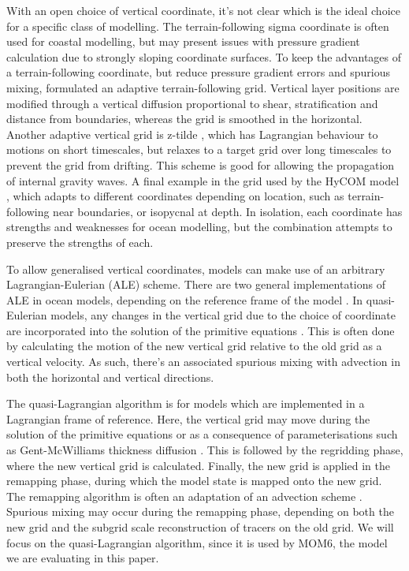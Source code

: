 With an open choice of vertical coordinate, it's not clear which is the ideal choice for a specific class of modelling. The terrain-following sigma coordinate is often used for coastal modelling, but may present issues with pressure gradient calculation due to strongly sloping coordinate surfaces. To keep the advantages of a terrain-following coordinate, but reduce pressure gradient errors and spurious mixing, \citet{hofmeister10} formulated an adaptive terrain-following grid. Vertical layer positions are modified through a vertical diffusion proportional to shear, stratification and distance from boundaries, whereas the grid is smoothed in the horizontal. Another adaptive vertical grid is z-tilde \citep{leclair11}, which has Lagrangian behaviour to motions on short timescales, but relaxes to a target grid over long timescales to prevent the grid from drifting. This scheme is good for allowing the propagation of internal gravity waves. A final example in the grid used by the HyCOM model \citep{bleck02}, which adapts to different coordinates depending on location, such as terrain-following near boundaries, or isopycnal at depth. In isolation, each coordinate has strengths and weaknesses for ocean modelling, but the combination attempts to preserve the strengths of each.

To allow generalised vertical coordinates, models can make use of an arbitrary Lagrangian-Eulerian (ALE) scheme. There are two general implementations of ALE in ocean models, depending on the reference frame of the model \citep{margolin03, leclair11}. In quasi-Eulerian models, any changes in the vertical grid due to the choice of coordinate are incorporated into the solution of the primitive equations \citep{kasahara74}. This is often done by calculating the motion of the new vertical grid relative to the old grid as a vertical velocity. As such, there's an associated spurious mixing with advection in both the horizontal and vertical directions.

The quasi-Lagrangian algorithm \citep{hirt74} is for models which are implemented in a Lagrangian frame of reference. Here, the vertical grid may move during the solution of the primitive equations or as a consequence of parameterisations such as Gent-McWilliams thickness diffusion \citep{gent90}. This is followed by the regridding phase, where the new vertical grid is calculated. Finally, the new grid is applied in the remapping phase, during which the model state is mapped onto the new grid. The remapping algorithm is often an adaptation of an advection scheme \citep{margolin03}. Spurious mixing may occur during the remapping phase, depending on both the new grid and the subgrid scale reconstruction of tracers on the old grid. We will focus on the quasi-Lagrangian algorithm, since it is used by MOM6, the model we are evaluating in this paper.

